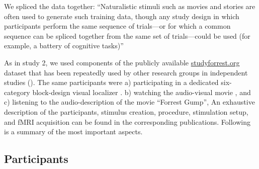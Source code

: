 




We spliced the data together: ``Naturalistic stimuli such as movies and stories
are often used to generate such training data, though any study design in which
participants perform the same sequence of trials—or for which a common sequence
can be spliced together from the same set of trials—could be used (for example,
a battery of cognitive tasks)'' \citep{cohen2017computational}

As in study 2, we
%
used components of the publicly available
\href{http://www.studyforrest.org}{studyforrest.org} dataset that has been
repeatedly used by other research groups in independent studies
(\citep[e.g.,][]{ben2018hippocampal, jiahui2020predicting, hu2017decoding,
lettieri2019emotionotopy, nguyen2016integration}).
The same participants were
a) participating in a dedicated six-category block-design visual localizer
\citep{sengupta2016extension}.
b) watching the audio-visual movie \citep{hanke2016simultaneous}, and
c) listening to the audio-description \citep{hanke2014audiomovie} of the movie
``Forrest Gump'',
An exhaustive description of the participants, stimulus creation, procedure,
stimulation setup, and fMRI acquisition can be found in the corresponding
publications. Following is a summary of the most important aspects.


\subsection{Participants}

